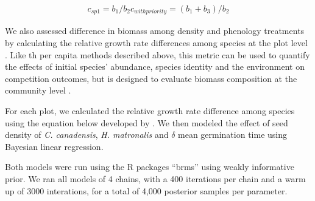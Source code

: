 \documentclass{article}\usepackage[]{graphicx}\usepackage[]{color}
\begin{document}
\begin{align*}

c_{sp1}= b_1/b_2 

c_{with priority}= (b_1+b_3)/b_2

\end{align*}

We also assessed difference in biomass among density and phenology treatments by calculating the relative growth rate differences among species at the plot level . Like th per capita methods described above, this metric can be used to quantify the effects of initial species’ abundance, species identity and the environment on competition outcomes, but is designed to evaluate biomass composition at the community level \citep{Connolly2005}.

For each plot, we calculated the relative growth rate difference among species using the equation below developed by \citet{Connolly2005}.
We then modeled the effect of seed density of \textit{C. canadensis}, \textit{H. matronalis} and $\delta$ mean germination time using Bayesian linear regression.

Both models were run using the R packages ``brms'' using weakly informative prior. We ran all models of 4 chains, with a 400 iterations per chain and a warm up of 3000 interations, for a total of 4,000 posterior samples per parameter. 



\end{document}
